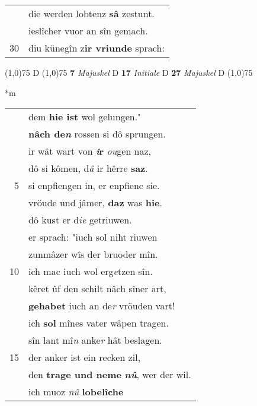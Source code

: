 \documentclass[8pt,a4paper,notitlepage]{article}
\begin{document}
\begin{table}[ht]
\begin{minipage}[t]{0.5\linewidth}
\begin{tabular}{rl}
 & die werden lobtenz \textbf{sâ} zestunt.\\ 
 & ieslîcher vuor an sîn gemach.\\ 
30 & diu künegîn z\textbf{ir vriunde} sprach:\\ 
\end{tabular}
\scriptsize
\line(1,0){75} \newline
D \newline
\line(1,0){75} \newline
\textbf{7} \textit{Majuskel} D  \textbf{17} \textit{Initiale} D  \textbf{27} \textit{Majuskel} D  \newline
\line(1,0){75} \newline
\newline
\end{minipage}
\hspace{0.5cm}
\begin{minipage}[t]{0.5\linewidth}
\small
\begin{center}*m
\end{center}
\begin{tabular}{rl}
 & dem \textbf{hie ist} wol gelungen."\\ 
 & \textbf{nâch de\textit{n}} rossen si dô sprungen.\\ 
 & ir wât wart von \textbf{\textit{i}r} \textit{ou}gen naz,\\ 
 & dô si kômen, d\textit{â} ir hêrre \textbf{saz}.\\ 
5 & si enpfiengen in, er enpfienc sie.\\ 
 & vröude und jâmer, \textbf{daz} was \textbf{hie}.\\ 
 & dô kust er d\textit{ie} getriuwen.\\ 
 & er sprach: "iuch sol niht riuwen\\ 
 & zunmâzer wîs der bruoder mîn.\\ 
10 & ich mac iuch wol erg\textit{e}tzen sîn.\\ 
 & kêret ûf den schilt nâch sîner art,\\ 
 & \textbf{gehabet} iuch an de\textit{r} vröuden vart!\\ 
 & ich \textbf{sol} mînes vater wâpen tragen.\\ 
 & sîn lant mî\textit{n} anke\textit{r} hât beslagen.\\ 
15 & der anker ist ein recken zil,\\ 
 & den \textbf{trage und neme} \textit{\textbf{nû}}, wer der wil.\\ 
 & ich muoz \textit{nû} \textbf{lobelîche}\\ 

\end{tabular}
\end{minipage}
\end{table}
\end{document}
